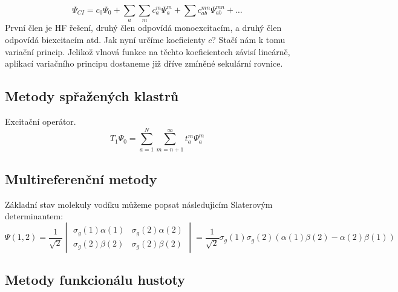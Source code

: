 \begin{equation}
\Psi_{CI}=c_0\Psi_0+\sum_a\sum_m c_a^m\Psi_a^m+\sum c_{ab}^{mn}\Psi_{ab}^{mn}+\dots
\end{equation}
První člen je HF řešení, druhý člen odpovídá monoexcitacím, a druhý člen odpovídá biexcitacím atd.
Jak nyní určíme koeficienty $c$? Stačí nám k tomu variační princip. Jelikož vlnová funkce na těchto koeficientech závisí lineárně,
aplikací variačního principu dostaneme již dříve zmíněné sekulární rovnice.


\subsection{Metody spřažených klastrů}

Excitační operátor.
\begin{equation}
T_1\Psi_0=\sum^N_{a=1}\sum_{m=n+1}^\infty t_a^m\Psi_a^m
\end{equation}

\subsection{Multireferenční metody}

Základní stav molekuly vodíku můžeme popsat následujicím Slaterovým determinantem:
\begin{equation}
\Psi (1,2)=\frac{1}{\sqrt{2}}
\begin{vmatrix}
\sigma_g(1)\alpha (1) & \sigma_g(2)\alpha (2) \\
\sigma_g(2)\beta (2) & \sigma_g(2)\beta (2)
\end{vmatrix}
=\frac{1}{\sqrt{2}}\sigma_g(1)\sigma_g(2)(\alpha (1)\beta (2)-\alpha (2)\beta (1))
\end{equation}

\subsection{Metody funkcionálu hustoty}


